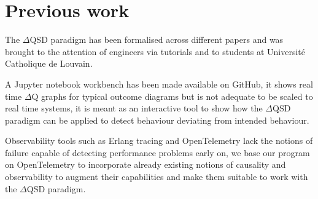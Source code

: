 \section{Previous work}
    The $\Delta$QSD paradigm has been formalised across different papers and was brought to the attention of engineers via tutorials and to students at Université Catholique de Louvain. 
    
    A Jupyter notebook workbench has been made available on GitHub, it shows real time $\Delta$Q graphs for typical outcome diagrams but is not adequate to be scaled to real time systems, it is meant as an interactive tool to show how the $\Delta$QSD paradigm can be applied to detect behaviour deviating from intended behaviour.
    
    Observability tools such as Erlang tracing and OpenTelemetry lack the notions of failure capable of detecting performance problems early on, we base our program on OpenTelemetry to incorporate already existing notions of causality and observability to augment their capabilities and make them suitable to work with the $\Delta$QSD paradigm.
